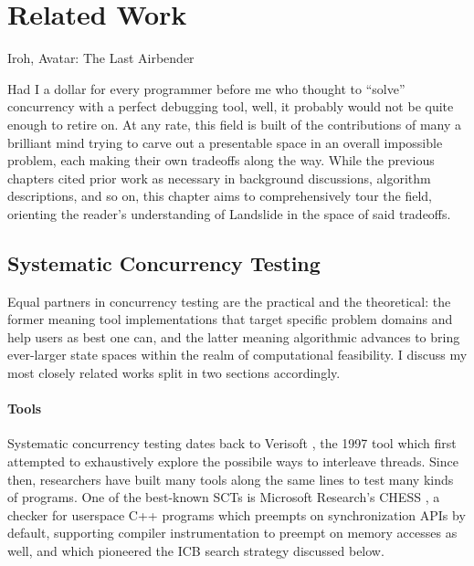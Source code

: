 \chapter{Related Work}
\label{chap:relatedwork}

{Iroh, Avatar: The Last Airbender}

Had I a dollar for every programmer before me who thought to ``solve'' concurrency with a perfect debugging tool,
well,
it probably would not be quite enough to retire on.
At any rate,
this field is built of the contributions of many a brilliant mind
trying to carve out a presentable space in an overall impossible problem,
each making their own tradeoffs along the way.
While the previous chapters cited prior work as necessary in background discussions, algorithm descriptions, and so on,
this chapter aims to comprehensively tour the field,
orienting the reader's understanding of Landslide in the space of said tradeoffs.

\section{Systematic Concurrency Testing}

Equal partners in concurrency testing are the practical and the theoretical:
the former meaning tool implementations that target specific problem domains and help users as best one can,
and the latter meaning algorithmic advances to bring ever-larger state spaces within the realm of computational feasibility.
I discuss my most closely related works split in two sections accordingly.

\subsubsection{Tools}

Systematic concurrency testing dates back to Verisoft \cite{verisoft},
the 1997 tool which first attempted to exhaustively explore the possibile ways to interleave threads.
Since then, researchers have built many tools along the same lines to test many kinds of programs.
One of the best-known SCTs is Microsoft Research's CHESS \cite{chess},
a checker for userspace C++ programs which preempts on synchronization APIs by default,
supporting compiler instrumentation to preempt on memory accesses as well,
and which pioneered the ICB search strategy discussed below.

